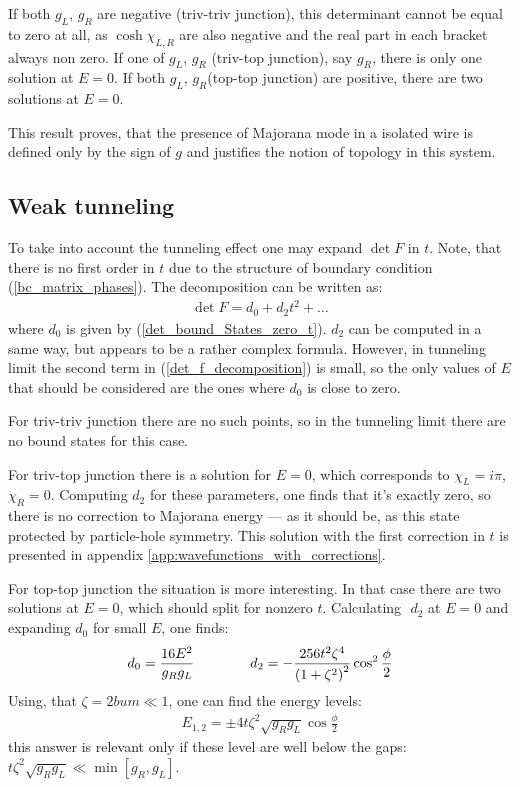 If both $ g_L $, $ g_R $ are negative (triv-triv junction), this determinant cannot be equal to zero at all, as $ \cosh \chi_{L,R} $ are also negative and the real part in each bracket always non zero.  If one of $ g_L $, $ g_R $ (triv-top junction), say $ g_R $,	 there is only one solution at $ E=0 $. If both $ g_L $, $ g_R $(top-top junction) are positive, there are two solutions at $ E=0 $.

This result proves, that the presence of Majorana mode in a isolated wire is defined only by the sign of $ g $ and justifies the notion of  topology in this system.

\subsection{Weak tunneling}
\label{subsect: weak_tunneling}

To take into account the tunneling effect one may expand $ \det F $ in $ t $. Note, that there is no first order in $ t $ due to the structure of boundary condition (\ref{bc_matrix_phases}). The decomposition can be written as:
\begin{gather}
\label{det_f_decomposition}
	\det F
	=
	d_0
	+
	d_2t^2
	+
	\dots
\end{gather}
where $ d_0 $ is given by (\ref{det_bound_States_zero_t}). $ d_2 $ can be computed in a same way, but appears to be  a rather complex formula.  However, in tunneling limit the second term in (\ref{det_f_decomposition}) is small, so the only values of $ E $ that should be considered are the ones where $ d_0 $ is close to zero.

For triv-triv junction there are no such points, so in the tunneling limit there are no bound states for this case.

For triv-top junction there is a solution for $ E=0 $, which corresponds to $ \chi_L=i \pi $, $ \chi_R=0 $. Computing $ d_2 $ for these parameters, one finds that it's exactly zero, so there is no correction to Majorana energy --- as it should be, as this state protected by particle-hole symmetry. This solution with the first correction in $ t $ is presented in appendix \ref{app:wavefunctions_with_corrections}.

For top-top junction the situation is more interesting. In that case there are two solutions at $ E=0 $, which should split for nonzero $ t $. Calculating $  $ $ d_2 $ at $ E=0 $ and expanding $ d_0 $ for small $ E $, one finds:
\begin{gather}
d_0=\frac{16E^2}{g_Rg_L}
\qquad\qquad
	d_2 = -\frac{256t^2\zeta^4}{\left(1+\zeta^2\right)^2}\cos^2\frac{\phi}{2}
\end{gather}
Using, that $ \zeta=2bum\ll1 $, one can find the energy levels:
\begin{gather}
	E_{1,2}
	=
	\pm
	4t\zeta^2\sqrt{g_Rg_L}\cos\frac{\phi}{2}
\end{gather}
this answer is relevant only if these level are well below the gaps: $ t\zeta^2\sqrt{g_Rg_L}\ll\min\left[g_R,g_L\right] $.
